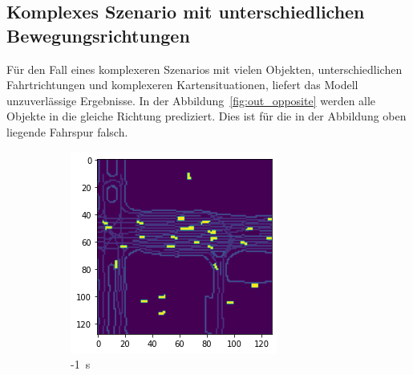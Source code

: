 \documentclass[12pt]{article}
\begin{document}
    \pagebreak
    \subsection{Komplexes Szenario mit unterschiedlichen Bewegungsrichtungen} 
        Für den Fall eines komplexeren Szenarios mit vielen Objekten, unterschiedlichen Fahrtrichtungen und 
        komplexeren Kartensituationen, liefert das Modell unzuverlässige Ergebnisse.
        In der Abbildung~\ref{fig:out_opposite} werden alle Objekte in die gleiche Richtung prediziert. 
        Dies ist für die in der Abbildung oben liegende Fahrspur falsch.

        \begin{figure}[H]
            \centering
            \begin{subfigure}[b]{0.18\textwidth}
                \includegraphics[width=\textwidth]{output_opposite_0.png}
                \caption{-1~s}
            \end{subfigure}
            ~
            \begin{subfigure}[b]{0.18\textwidth}

\end{subfigure}
\end{figure}
\end{document}
